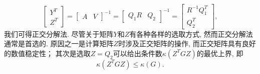 \begin{equation*}
\begin{bmatrix} Y^T \\ Z^T \end{bmatrix} = \begin{bmatrix} A & V \end{bmatrix}^{-1} = \begin{bmatrix} Q_1R & Q_2 \end{bmatrix}^{-1} = \begin{bmatrix} R^{-1} Q_1^T \\ Q_2^T \end{bmatrix},
\end{equation*}
我们可得正交分解法. 尽管关于矩阵$Y$和$Z$有各种各样的选取方式, 然而正交分解法通常是首选的. 原因之一是计算矩阵$Z$时涉及正交矩阵的操作, 而正交矩阵具有良好的数值稳定性； 其次是选取$Z = Q_2$可以给出条件数$\kappa(Z^T G Z)$的最优上界, 即
\begin{equation*}
\kappa(Z^T G Z) \leqslant \kappa(G).
\end{equation*}

